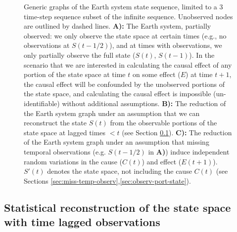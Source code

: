 \documentclass[12pt]{article}
\begin{document}
\begin{figure} 
  \caption{Generic graphs of the Earth system state sequence, limited
    to a 3 time-step sequence subset of the infinite
    sequence. Unobserved nodes are outlined by dashed
    lines. \textbf{A):} The Earth system, partially observed: we only
    observe the state space at certain times (e.g., no observations at
    $S(t-1/2)$), and at times with observations, we only partially
    observe the full state ($S(t)$, $S(t-1)$). In the scenario that we
    are interested in calculating the causal effect of any portion of
    the state space at time $t$ on some effect ($E$) at time $t+1$,
    the causal effect will be confounded by the unobserved portions of
    the state space, and calculating the causal effect is impossible
    (un-identifiable) without additional assumptions. \textbf{B):} The
    reduction of the Earth system graph under an assumption that we
    can reconstruct the state $S(t)$ from the observable portions of
    the state space at lagged times $< t$ (see Section
    \ref{sec:stat-reconstr-state}). \textbf{C):} The reduction of the
    Earth system graph under an assumption that missing temporal
    observations (e.g. $S(t-1/2)$ in \textbf{A)}) induce independent
    random variations in the cause ($C(t)$) and effect
    ($E(t+1)$). $S'(t)$ denotes the state space, not including the
    cause $C(t)$ (see Sections
    \ref{sec:miss-temp-observ},\ref{sec:observ-port-state}).}
  \label{fig:generic}
\end{figure}

\subsection{Statistical reconstruction of the state space with time
  lagged observations}
\label{sec:stat-reconstr-state}

\end{document}
